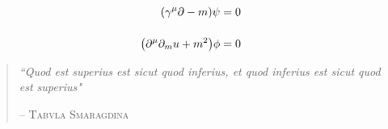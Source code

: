 \vspace*{3in}
{\LARGE
	\begin{align*}
		\qty(\gamma^\mu \partial - m)\psi &= 0\\[12pt]
		\qty(\partial^\mu\partial_mu + m^2)\phi &= 0
	\end{align*}
}
\vfill
{\large
\setlength{\leftmargin}{4cm}
\setlength{\rightmargin}{4cm}
\begin{quote}
	\textit{``Quod est superius est sicut quod inferius, et quod inferius est sicut quod est superius"}
	
	\hfill -- \textsc{Tabvla Smaragdina}
\end{quote}
}
